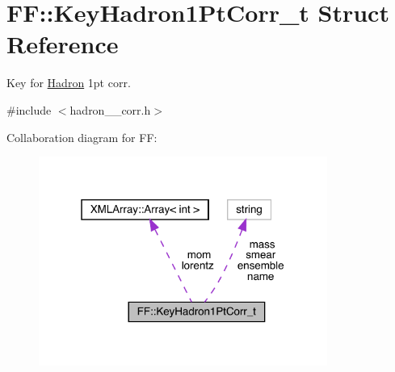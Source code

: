 \hypertarget{structFF_1_1KeyHadron1PtCorr__t}{}\section{FF\+:\+:Key\+Hadron1\+Pt\+Corr\+\_\+t Struct Reference}
\label{structFF_1_1KeyHadron1PtCorr__t}


Key for \mbox{\hyperlink{namespaceHadron}{Hadron}} 1pt corr.  




{\ttfamily \#include $<$hadron\+\_\+1pt\+\_\+corr.\+h$>$}



Collaboration diagram for FF\+:\nopagebreak
\begin{figure}[H]
\begin{center}
\leavevmode
\includegraphics[width=268pt]{dd/d00/structFF_1_1KeyHadron1PtCorr__t__coll__graph}
\end{center}
\end{figure}
